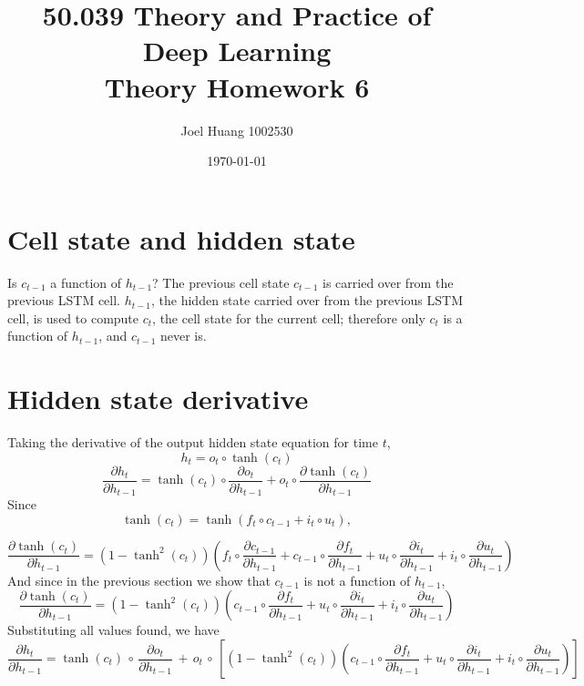 \documentclass[9pt]{article}
\title{
	50.039 Theory and Practice of Deep Learning\\
	Theory Homework 6
}
\author{Joel Huang 1002530}
\date{\today}
\newcommand{\del}{\partial}
\begin{document}
\maketitle

\section*{Cell state and hidden state}
Is $c_{t-1}$ a function of $h_{t-1}$? The previous cell state
$c_{t-1}$ is carried over from the previous LSTM cell. $h_{t-1}$,
the hidden state carried over from the previous LSTM cell, is used
to compute $c_{t}$, the cell state for the current cell; therefore
only $c_{t}$ is a function of $h_{t-1}$, and $c_{t-1}$ never is.

\section*{Hidden state derivative}
Taking the derivative of the output hidden state equation for time $t$,
\begin{equation*}
	h_t = o_t \circ \tanh(c_t)
\end{equation*}
\begin{equation*}
	\frac{\del h_t}{\del h_{t-1}} = \tanh(c_t)\circ\frac{\del o_t}{\del h_{t-1}} + o_t\circ\frac{\del \tanh(c_t)}{\del h_{t-1}}
\end{equation*}
Since
\begin{equation*}
	\tanh(c_t) = \tanh(f_t \circ c_{t-1} + i_t \circ u_t),
\end{equation*}

\begin{equation*}
	\frac{\del \tanh(c_t)}{\del h_{t-1}} = (1 - \tanh^2(c_t)) \left( f_t\circ\frac{\del c_{t-1}}{\del h_{t-1}} + c_{t-1}\circ\frac{\del f_t}{\del h_{t-1}} + u_t\circ\frac{\del i_t}{\del h_{t-1}} + i_t\circ\frac{\del u_t}{\del h_{t-1}}\right)
\end{equation*}
And since in the previous section we show that $c_{t-1}$ is not a function of $h_{t-1}$,
\begin{equation*}
	\frac{\del \tanh(c_t)}{\del h_{t-1}} = (1 - \tanh^2(c_t)) \left( c_{t-1}\circ\frac{\del f_t}{\del h_{t-1}} + u_t\circ\frac{\del i_t}{\del h_{t-1}} + i_t\circ\frac{\del u_t}{\del h_{t-1}}\right)
\end{equation*}
Substituting all values found, we have
\begin{equation*}
	\frac{\del h_t}{\del h_{t-1}} = \tanh(c_t)\,\circ\,\frac{\del o_t}{\del h_{t-1}}\,+\,o_t\,\circ\,\left[(1 - \tanh^2(c_t)) \left( c_{t-1}\circ\frac{\del f_t}{\del h_{t-1}} + u_t\circ\frac{\del i_t}{\del h_{t-1}} + i_t\circ\frac{\del u_t}{\del h_{t-1}}\right)\right]
\end{equation*}
\end{document}
